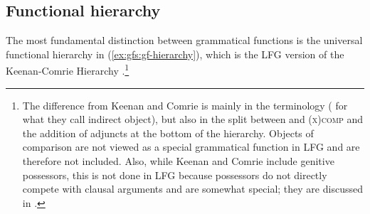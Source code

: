 \documentclass[output=paper]{../langscibook}
\begin{document}
 \subsection{Functional hierarchy\label{sect:gfs:hier}}
 
 The most fundamental distinction between grammatical functions is the universal functional hierarchy in (\ref{ex:gfs:gf-hierarchy}), which is the LFG version of the Keenan-Comrie Hierarchy \citep{keenan1977noun}.\footnote{The difference from Keenan and Comrie is mainly in the terminology ({\OBJTHETA} for what they call indirect object), but also in the split between \OBJ and \textsc{(x)comp} and the addition of adjuncts at the bottom of the hierarchy. Objects of comparison are not viewed as a special grammatical function in LFG and are therefore not included. Also, while Keenan and Comrie include genitive possessors, this is not done in LFG because possessors do not directly compete with clausal arguments and are somewhat special; they are discussed in .}
 
\end{document}
